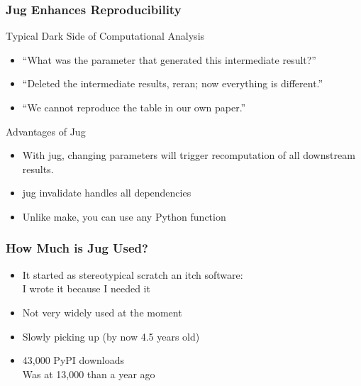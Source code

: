 \documentclass{beamer}
\begin{document}
\begin{frame}[fragile]
\frametitle{Jug Enhances Reproducibility}

\begin{block}{Typical \alert{Dark Side} of Computational Analysis}
\begin{itemize}
\item ``What was the parameter that generated this intermediate result?''
\item ``Deleted the intermediate results, reran; now everything is different.''
\item ``We cannot reproduce the table in our own paper.''
\end{itemize}
\end{block}

\begin{block}{Advantages of Jug}


\begin{itemize}
\item With jug, changing parameters \alert{will trigger recomputation of all
downstream results}.
\item \alert{jug invalidate} handles all dependencies
\item Unlike \alert{make}, you can use any Python function
\end{itemize}

\end{block}

\end{frame}
\begin{frame}[fragile]
\frametitle{How Much is Jug Used?}

\begin{itemize}
\item It started as stereotypical \alert{scratch an itch} software:\\
    I wrote it because I needed it
\item Not very widely used at the moment
\item Slowly picking up (by now 4.5 years old)
\item 43,000 PyPI downloads\\
    \alert{Was at 13,000 than a year ago}
\end{itemize}

\end{frame}
\end{document}
